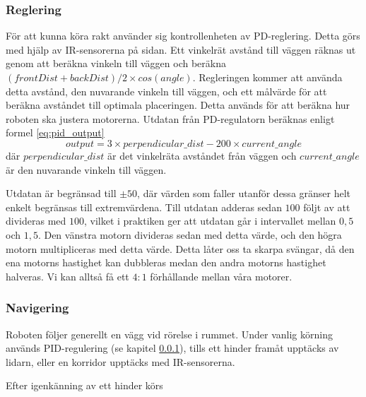 \documentclass[a4paper,11pt]{article}
\begin{document}
\subsubsection{Reglering}
\label{sec:pid}

För att kunna köra rakt använder sig kontrollenheten av PD-reglering. Detta görs med hjälp av IR-sensorerna på sidan. Ett vinkelrät avstånd till väggen räknas ut genom att beräkna vinkeln till väggen och beräkna $ (frontDist+backDist)/2 \times cos(angle)$. Regleringen kommer att använda detta avstånd, den nuvarande vinkeln till väggen, och ett målvärde för att beräkna avståndet till optimala placeringen. Detta används för att beräkna hur roboten ska justera motorerna. Utdatan från PD-regulatorn beräknas enligt formel \ref{eq:pid_output}
\begin{equation}\label{eq:pid_output}
output = 3 \times perpendicular\_dist - 200 \times current\_angle
\end{equation}
där $perpendicular\_dist$ är det vinkelräta avståndet från väggen och $current\_angle$ är den nuvarande vinkeln till väggen.
\texttt{\meaning\frown}

Utdatan är begränsad till $\pm 50$, där värden som faller utanför dessa gränser helt enkelt begränsas till extremvärdena. Till utdatan adderas sedan $100$ följt av att divideras med $100$, vilket i praktiken ger att utdatan går i intervallet mellan $0,5$ och $1,5$. Den vänstra motorn divideras sedan med detta värde, och den högra motorn multipliceras med detta värde. Detta låter oss ta skarpa svängar, då den ena motorns hastighet kan dubbleras medan den andra motorns hastighet halveras. Vi kan alltså få ett $4:1$ förhållande mellan våra motorer.

\subsubsection{Navigering}
Roboten följer generellt en vägg vid rörelse i rummet. Under vanlig körning används PID-regulering (se kapitel \ref{sec:pid}), tills ett hinder framåt upptäcks av lidarn, eller en korridor upptäcks med IR-sensorerna. 

Efter igenkänning av ett hinder körs 
\end{document}
